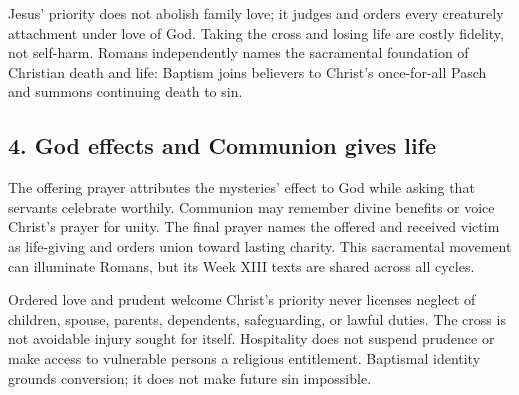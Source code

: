 Jesus' priority does not abolish family love; it judges and orders every creaturely attachment under love of God. Taking the cross and losing life are costly fidelity, not self-harm. Romans independently names the sacramental foundation of Christian death and life: Baptism joins believers to Christ's once-for-all Pasch and summons continuing death to sin.

\subsection*{4. God effects and Communion gives life\enspace{}}

The offering prayer attributes the mysteries' effect to God while asking that servants celebrate worthily. Communion may remember divine benefits or voice Christ's prayer for unity. The final prayer names the offered and received victim as life-giving and orders union toward lasting charity. This sacramental movement can illuminate Romans, but its Week XIII texts are shared across all cycles.

\begin{studybox}{Ordered love and prudent welcome}
Christ's priority never licenses neglect of children, spouse, parents, dependents, safeguarding, or lawful duties. The cross is not avoidable injury sought for itself. Hospitality does not suspend prudence or make access to vulnerable persons a religious entitlement. Baptismal identity grounds conversion; it does not make future sin impossible.
\end{studybox}
